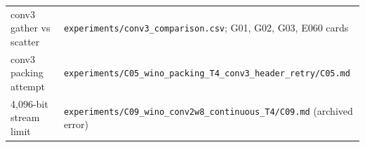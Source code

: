 \begin{table}[!htbp]
\begin{tabularx}{\linewidth}{L{5.2cm}Y}
conv3 gather vs scatter & \texttt{experiments/\allowbreak{}conv3\_\allowbreak{}comparison.csv}; G01, G02, G03, E060 cards \\
conv3 packing attempt & \texttt{experiments/\allowbreak{}C05\_\allowbreak{}wino\_\allowbreak{}packing\_\allowbreak{}T4\_\allowbreak{}conv3\_\allowbreak{}header\_\allowbreak{}retry/\allowbreak{}C05.md} \\
4,096-bit stream limit & \texttt{experiments/\allowbreak{}C09\_\allowbreak{}wino\_\allowbreak{}conv2w8\_\allowbreak{}continuous\_\allowbreak{}T4/\allowbreak{}C09.md} (archived error) \\
\bottomrule
\end{tabularx}
\end{table}
